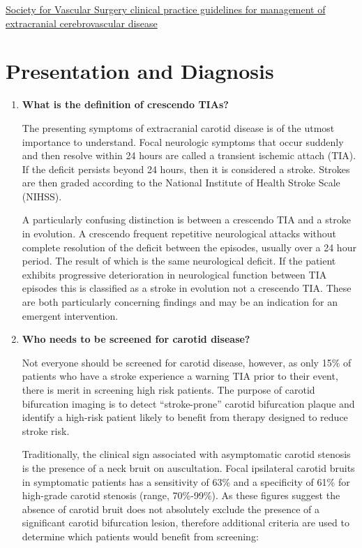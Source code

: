 \documentclass[
]{book}
\begin{document}
\href{https://www.jvascsurg.org/article/S0741-5214(21)00893-4/fulltext}{Society for Vascular Surgery clinical practice guidelines for
management of extracranial cerebrovascular
disease}
\citep{aburahmaSocietyVascularSurgery2022}

\hypertarget{presentation-and-diagnosis}{%
\section{Presentation and Diagnosis}\label{presentation-and-diagnosis}}

\begin{enumerate}
\def\labelenumi{\arabic{enumi}.}
\item
  \textbf{What is the definition of crescendo TIAs?}

  The presenting symptoms of extracranial carotid disease is of the
  utmost importance to understand. Focal neurologic symptoms that
  occur suddenly and then resolve within 24 hours are called a
  transient ischemic attach (TIA). If the deficit persists beyond 24
  hours, then it is considered a stroke. Strokes are then graded
  according to the National Institute of Health Stroke Scale
  (NIHSS).\citep{fischer2010}

  A particularly confusing distinction is between a crescendo TIA and
  a stroke in evolution. A crescendo frequent repetitive neurological
  attacks without complete resolution of the deficit between the
  episodes, usually over a 24 hour period. The result of which is the
  same neurological deficit. If the patient exhibits progressive
  deterioration in neurological function between TIA episodes this is
  classified as a stroke in evolution not a crescendo TIA.\citep{ricotta}
  These are both particularly concerning findings and may be an
  indication for an emergent intervention.
\item
  \textbf{Who needs to be screened for carotid disease?}

  Not everyone should be screened for carotid disease, however, as
  only 15\% of patients who have a stroke experience a warning TIA
  prior to their event, there is merit in screening high risk
  patients.\citep{rockman2019} The purpose of carotid bifurcation imaging
  is to detect ``stroke-prone'' carotid bifurcation plaque and identify
  a high-risk patient likely to benefit from therapy designed to
  reduce stroke risk.

  Traditionally, the clinical sign associated with asymptomatic
  carotid stenosis is the presence of a neck bruit on auscultation.
  Focal ipsilateral carotid bruits in symptomatic patients has a
  sensitivity of 63\% and a specificity of 61\% for high-grade carotid
  stenosis (range, 70\%-99\%). As these figures suggest the absence of
  carotid bruit does not absolutely exclude the presence of a
  significant carotid bifurcation lesion, therefore additional
  criteria are used to determine which patients would benefit from
  screening:


\end{enumerate}
\end{document}
